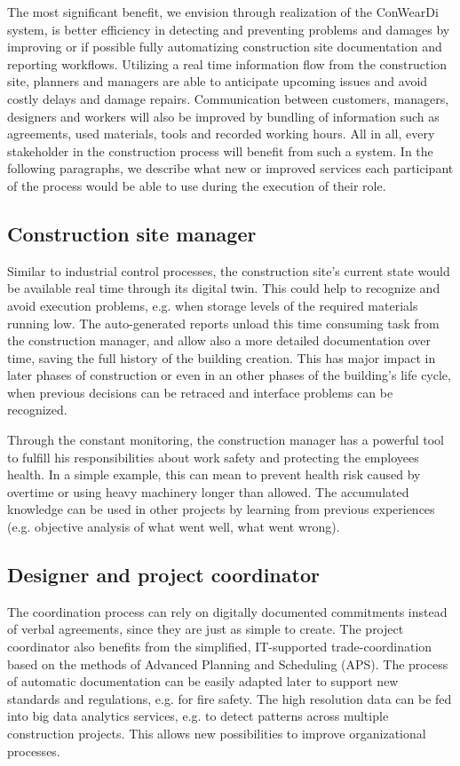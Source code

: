 The most significant benefit, we envision through realization of the ConWearDi system, is better efficiency in detecting and preventing problems and damages by improving or if possible fully automatizing construction site documentation and reporting workflows. 
Utilizing a real time information flow from the construction site, planners and managers are able to anticipate upcoming issues and avoid costly delays and damage repairs. 
Communication between customers, managers, designers and workers will also be improved by bundling of information such as agreements, used materials, tools and recorded working hours.
All in all, every stakeholder in the construction process will benefit from such a system. 
In the following paragraphs, we describe what new or improved services each participant of the process would be able to use during the execution of their role.


\subsection{Construction site manager}
Similar to industrial control processes, the construction site's current state would be available real time through its digital twin.
This could help to recognize and avoid execution problems, e.g. when storage levels of the required materials running low.
The auto-generated reports unload this time consuming task from the construction manager, and allow also a more detailed documentation over time, saving the full history of the building creation.
This has major impact in later phases of construction or even in an other phases of the building's life cycle, when previous decisions can be retraced and interface problems can be recognized. 

Through the constant monitoring, the construction manager has a powerful tool to fulfill his responsibilities about work safety and protecting the employees health. In a simple example, this can mean to prevent health risk caused by overtime or using heavy machinery longer than allowed.
The accumulated knowledge can be used in other projects by learning from previous experiences (e.g. objective analysis of what went well, what went wrong).

\subsection{Designer and project coordinator}
The coordination process can rely on digitally documented commitments instead of verbal agreements, since they are just as simple to create.
The project coordinator also benefits from the simplified, IT-supported trade-coordination based on the methods of Advanced Planning and Scheduling (APS).
The process of automatic documentation can be easily adapted later to support new standards and regulations, e.g. for fire safety.
The high resolution data can be fed into big data analytics services, e.g. to detect patterns across multiple construction projects.
This allows new possibilities to improve organizational processes.

